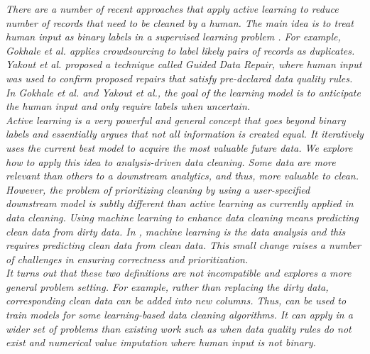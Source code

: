 \emph{There are a number of recent approaches that apply active learning to reduce number of records that need to be cleaned by a human.
The main idea is to treat human input as binary labels in a supervised learning problem \cite{DBLP:journals/pvldb/MozafariSFJM14}.
For example, Gokhale et al. \cite{gokhale2014corleone} applies crowdsourcing to label likely pairs of records as duplicates.
Yakout et al. \cite{DBLP:journals/pvldb/YakoutENOI11} proposed a technique called Guided Data Repair, where human input was used to confirm proposed repairs that satisfy pre-declared data quality rules.
In Gokhale et al. and Yakout et al., the goal of the learning model is to anticipate the human input and only require labels when uncertain.\\
Active learning is a very powerful and general concept that goes beyond binary labels and essentially argues that not all information is created equal.
It iteratively uses the current best model to acquire the most valuable future data.
We explore how to apply this idea to analysis-driven data cleaning. 
Some data are more relevant than others to a downstream analytics, and thus, more valuable to clean.
However, the problem of prioritizing cleaning by using a user-specified downstream model is subtly different than active learning as currently applied in data cleaning.
Using machine learning to enhance data cleaning means predicting clean data from dirty data.
In \sys, machine learning is the data analysis and this requires predicting clean data from \emph{clean data}.
This small change raises a number of challenges in ensuring correctness and prioritization.\\
It turns out that these two definitions are not incompatible and \sys explores a more general problem setting.
For example, rather than replacing the dirty data, corresponding clean data can be added into new columns. 
Thus, \sys can be used to train models for some learning-based data cleaning algorithms.
It can apply in a wider set of problems than existing work such as when data quality rules do not exist and numerical value imputation where human input is not binary.}

